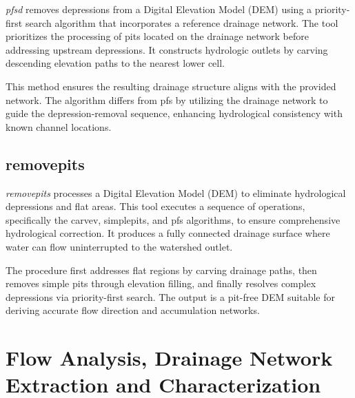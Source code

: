 \documentclass[
]{book}
\theoremstyle{definition}
\theoremstyle{definition}
\theoremstyle{definition}
\theoremstyle{definition}
\theoremstyle{remark}
\begin{document}
\emph{pfsd} removes depressions from a Digital Elevation Model (DEM) using a priority-first search algorithm that incorporates a reference drainage network. The tool prioritizes the processing of pits located on the drainage network before addressing upstream depressions. It constructs hydrologic outlets by carving descending elevation paths to the nearest lower cell.

This method ensures the resulting drainage structure aligns with the provided network. The algorithm differs from pfs by utilizing the drainage network to guide the depression-removal sequence, enhancing hydrological consistency with known channel locations.

\subsection{removepits}\label{removepits}

\emph{removepits} processes a Digital Elevation Model (DEM) to eliminate hydrological depressions and flat areas. This tool executes a sequence of operations, specifically the carvev, simplepits, and pfs algorithms, to ensure comprehensive hydrological correction. It produces a fully connected drainage surface where water can flow uninterrupted to the watershed outlet.

The procedure first addresses flat regions by carving drainage paths, then removes simple pits through elevation filling, and finally resolves complex depressions via priority-first search. The output is a pit-free DEM suitable for deriving accurate flow direction and accumulation networks.

\section{Flow Analysis, Drainage Network Extraction and Characterization}\label{Flow-Analysis-Drainage-Network-Extraction-and-Characterization}
\end{document}
